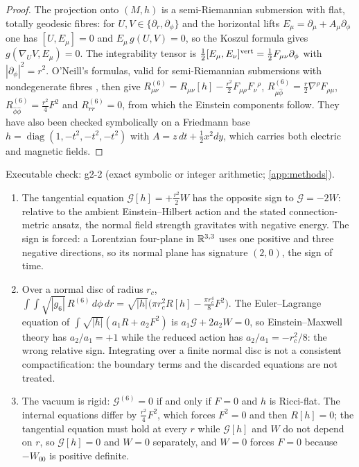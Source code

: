 \begin{proof}
The projection onto $(M,h)$ is a semi-Riemannian submersion with flat, totally geodesic fibres: for $U,V\in\{\partial_r,\partial_\phi\}$ and the horizontal lifts
$E_\mu=\partial_\mu+A_\mu\partial_\phi$ one has $[U,E_\mu]=0$ and $E_\mu\,g(U,V)=0$, so the Koszul formula gives $g(\nabla_UV,E_\mu)=0$. The integrability tensor is
$\tfrac12[E_\mu,E_\nu]^{\rm vert}=\tfrac12F_{\mu\nu}\partial_\phi$ with $|\partial_\phi|^2=r^2$. O'Neill's formulas, valid for semi-Riemannian submersions with nondegenerate
fibres \cite{ONeill66,ONeill83,Besse87}, then give $R^{(6)}_{\mu\nu}=R_{\mu\nu}[h]-\tfrac{r^2}2F_{\mu\rho}F_\nu{}^\rho$, $R^{(6)}_{\mu\hat\phi}=\tfrac r2\nabla^\rho F_{\rho\mu}$,
$R^{(6)}_{\hat\phi\hat\phi}=\tfrac{r^2}4F^2$ and $R^{(6)}_{rr}=0$, from which the Einstein components follow. They have also been checked symbolically on a Friedmann base
$h=\operatorname{diag}(1,-t^2,-t^2,-t^2)$ with $A=z\,dt+\tfrac12x^2dy$, which carries both electric and magnetic fields.
\end{proof}

\noindent Executable check: g2-2 (exact symbolic or integer arithmetic; \cref{app:methods}).

\begin{corollary}
\label{cor:ein6}
\begin{enumerate}[label=(\roman*),leftmargin=2.2em]
\item The tangential equation $\mathcal G[h]=+\tfrac{r^2}2W$ has the opposite sign to $\mathcal G=-2W$: relative to the ambient Einstein--Hilbert action and the stated
connection-metric ansatz, the normal field strength gravitates with negative energy.
The sign is forced: a Lorentzian four-plane in $\mathbb{R}^{3,3}$ uses one positive and three negative directions, so its normal plane has signature $(2,0)$, the
sign of time.
\item Over a normal disc of radius $r_c$, $\int\!\!\int\sqrt{|g_6|}\,R^{(6)}\,d\phi\,dr=\sqrt{|h|}\bigl(\pi r_c^2R[h]-\tfrac{\pi r_c^4}8F^2\bigr)$. The Euler--Lagrange
equation of $\int\sqrt{|h|}(a_1R+a_2F^2)$ is $a_1\mathcal G+2a_2W=0$, so Einstein--Maxwell theory has $a_2/a_1=+1$ while the reduced action has $a_2/a_1=-r_c^2/8$: the
wrong relative sign. Integrating over a finite normal disc is not a consistent compactification: the boundary terms and the discarded equations are not
treated.
\item The vacuum is rigid: $\mathcal G^{(6)}=0$ if and only if $F=0$ and $h$ is Ricci-flat. The internal equations differ by $\tfrac{r^2}4F^2$, which forces $F^2=0$ and
then $R[h]=0$; the tangential equation must hold at every $r$ while $\mathcal G[h]$ and $W$ do not depend on $r$, so $\mathcal G[h]=0$ and $W=0$ separately, and $W=0$
forces $F=0$ because $-W_{00}$ is positive definite.
\end{enumerate}
\end{corollary}

